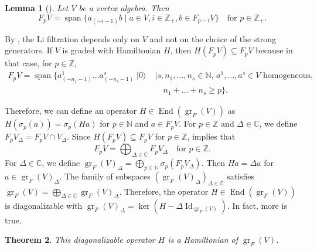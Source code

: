 \documentclass[a4paper, 12pt, reqno]{amsart}
\newtheorem{theorem}{Theorem}[section]
\newtheorem{lemma}[theorem]{Lemma}
\theoremstyle{remark}
\DeclareMathOperator{\Id}{Id}
\DeclareMathOperator{\gr}{gr}
\DeclareMathOperator{\End}{End}
\DeclareMathOperator{\vspan}{span}
\DeclareMathOperator{\vac}{|0\rangle}
\begin{document}
\begin{lemma}[{\cite[Lemma 2.9]{li_abelianizing_2005}}]
  \label{lmm:23}
  Let $V$ be a vertex algebra.
  Then
  \begin{equation*}
    F_pV = \vspan\{a_{(-i - 1)}b \mid a \in V, i \in \mathbb{Z}_+, b \in F_{p - i}V\} \quad \text{for $p \in \mathbb{Z}_+$}.
  \end{equation*}
\end{lemma}

By , the Li filtration depends only on $V$ and not on the choice of the strong generators.
If $V$ is graded with Hamiltonian $H$, then $H(F_pV) \subseteq F_pV$ because in that case, for $p \in \mathbb{Z}$,
\begin{equation*}
  \begin{split}
    F_pV = \vspan\{a^1_{(-n_1 - 1)}\dots a^s_{(-n_s - 1)}\vac &\mid \text{$s, n_1, \dots, n_s \in \mathbb{N}$, $a^1, \dots, a^s \in V$ homogeneous,} \\
                                                              &\quad n_1 + \dots + n_s \ge p\}.
  \end{split}
\end{equation*}

Therefore, we can define an operator $H \in \End(\gr_F(V))$ as $H(\sigma_p(a)) = \sigma_p(Ha)$ for $p \in \mathbb{N}$ and $a \in F_pV$.
For $p \in \mathbb{Z}$ and $\Delta \in \mathbb{C}$, we define $F_pV_{\Delta} = F_pV \cap V_{\Delta}$.
Since $H(F_pV) \subseteq F_pV$ for $p \in \mathbb{Z}$,  implies that
\begin{equation*}
  F_pV = \bigoplus_{\Delta \in \mathbb{C}}F_pV_{\Delta} \quad \text{for $p \in \mathbb{Z}$}.
\end{equation*}
For $\Delta \in \mathbb{C}$, we define $\gr_F(V)_{\Delta} = \bigoplus_{p \in \mathbb{N}}\sigma_p(F_pV_{\Delta})$.
Then $Ha = \Delta a$ for $a \in \gr_F(V)_{\Delta}$.
The family of subspaces $(\gr_F(V)_{\Delta})_{\Delta \in \mathbb{C}}$ satisfies $\gr_F(V) = \bigoplus_{\Delta \in \mathbb{C}}\gr_F(V)_{\Delta}$.
Therefore, the operator $H \in \End(\gr_F(V))$ is diagonalizable with $\gr_F(V)_{\Delta} = \ker(H - \Delta\Id_{\gr_F(V)})$.
In fact, more is true.

\begin{theorem}
  \label{thr:51}
  This diagonalizable operator $H$ is a Hamiltonian of $\gr_F(V)$.
\end{theorem}
\end{document}
